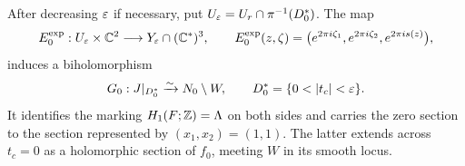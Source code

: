 \begin{proposition}
\label{prop:cusp-identification}
After decreasing $\varepsilon$ if necessary, put
$U_\varepsilon=U_r\cap\pi^{-1}(D_0^*)$.  The map
\begin{equation}\label{eq:cusp-exp-map}
 E_0^{\exp}:U_\varepsilon\times\mathbb C^2\longrightarrow
 Y_\varepsilon\cap(\mathbb C^*)^3,
 \qquad
 E_0^{\exp}(z,\zeta)=
 \bigl(e^{2\pi i\zeta_1},e^{2\pi i\zeta_2},e^{2\pi is(z)}\bigr),
\end{equation}
induces a biholomorphism
\begin{equation}\label{eq:G0}
 G_0:J|_{D_0^*}\xrightarrow{\sim}N_0\setminus W,
 \qquad D_0^*=\{0<|t_c|<\eps\}.
\end{equation}
It identifies the marking $H_1(F;\mathbb Z)=\Lambda$ on both sides and carries the
zero section to the section represented by $(x_1,x_2)=(1,1)$.  The latter
extends across $t_c=0$ as a holomorphic section of $f_0$, meeting $W$ in
its smooth locus.
\end{proposition}

